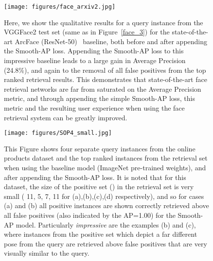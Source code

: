 \documentclass[runningheads]{llncs}
\newcommand\beforecaptions{\vspace{-3mm}}
\newcommand\aftercaptions{\vspace{-5mm}}
\begin{document}
\begin{figure}[htp]
\begin{center}
   \texttt{[image: figures/face\_arxiv2.jpg]}
\end{center}
\vspace{-10pt}
\beforecaptions
   \caption{\small{Here, we show the qualitative results for a query instance from the VGGFace2 test set (same as in Figure~\ref{face_3}) for the state-of-the-art ArcFace (ResNet-50)~\cite{Deng19} baseline, both before and after appending the Smooth-AP loss. Appending the Smooth-AP loss to this impressive baseline leads to a large gain in Average Precision (24.8\%), and again to the removal of all false positives from the top ranked retrieval results. This demonstrates that state-of-the-art face retrieval networks are far from saturated on the Average Precision metric, and through appending the simple Smooth-AP loss, this metric and the resulting user experience when using the face retrieval system can be greatly improved.}}
 \aftercaptions
 \vspace{-1mm}
 \label{face_4}
\end{figure}



\begin{figure}[htp]
\begin{center}
   \texttt{[image: figures/SOP4\_small.jpg]}
\end{center}
\vspace{-10pt}
\beforecaptions
   \caption{\small{This Figure shows four separate query instances from the online products dataset and the top ranked instances from the retrieval set when using the baseline model (ImageNet pre-trained weights), and after appending the Smooth-AP loss. It is noted that for this dataset, the size of the positive set () in the retrieval set is very small ( 11, 5, 7, 11 for (a),(b),(c),(d) respectively), and so for cases (a) and (b) all positive instances are shown correctly retrieved above all false positives (also indicated by the AP=1.00) for the Smooth-AP model. Particularly \textit{impressive} are the examples (b) and (c), where instances from the positive set which depict a far different pose from the query are retrieved above false positives that are very visually similar to the query. }}
 \aftercaptions
 \vspace{-1mm}
 \label{SOP}
\end{figure}
\end{document}
